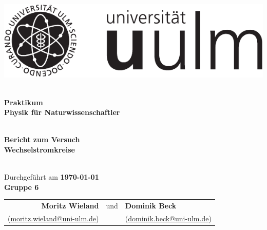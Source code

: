 \documentclass[11pt]{betterallrounder}
\begin{document}
\begin{titlepage}

    \begin{center}

        \begin{minipage}{\textwidth}
            \begin{center}
                \includegraphics{bilder/Logo_uulm_Vorlage_100mm_schwarz.pdf}
            \end{center}
        \end{minipage}
    
        \textsc{\Large }\\[1.5cm]
        
        {\huge \bfseries Praktikum\\[0.5cm]}
        {\huge \bfseries Physik für Naturwissenschaftler}

        \textsc{\Large }\\[1.5cm]

        {\large \bfseries Bericht zum Versuch}\\[0.5cm]
        
        {\huge \bfseries Wechselstromkreise\\[0.4cm]}

        \textsc{\Large }\\[1.5cm]

        {\large Durchgeführt am \bfseries{\today}}\\[1cm]
        
        {\huge \bfseries Gruppe 6\\[0.4cm]}

        \Large
        \begin{tabular}{rcl}
            \bfseries{Moritz Wieland} & und & \bfseries{Dominik Beck}\\
            (\href{mailto:moritz.wieland@uni-ulm.de}{moritz.wieland@uni-ulm.de}) & & (\href{mailto:dominik.beck@uni-ulm.de}{dominik.beck@uni-ulm.de})
        \end{tabular}

        \textsc{\huge }\\[1cm]


\end{center}
\end{titlepage}
\end{document}
